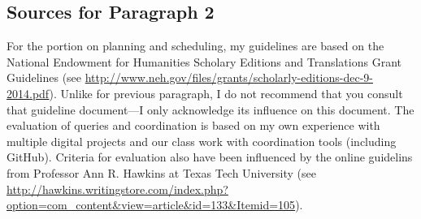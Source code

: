 \documentclass[9pt,oneside,notitlepageletterpaperopenright]{article}
\begin{document}
\subsection*{Sources for Paragraph 2}\label{sources-for-paragraph-2}

For the portion on planning and scheduling, my guidelines are based on
the National Endowment for Humanities Scholary Editions and Translations
Grant Guidelines (see
\url{http://www.neh.gov/files/grants/scholarly-editions-dec-9-2014.pdf}).
Unlike for previous paragraph, I do not recommend that you consult that
guideline document---I only acknowledge its influence on this document.
The evaluation of queries and coordination is based on my own experience
with multiple digital projects and our class work with coordination
tools (including GitHub). Criteria for evaluation also have been
influenced by the online guidelins from Professor Ann R. Hawkins at
Texas Tech University (see
\url{http://hawkins.writingstore.com/index.php?option=com_content\&view=article\&id=133\&Itemid=105}).
\end{document}
